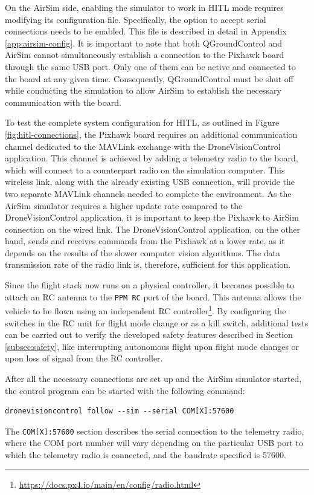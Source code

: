 On the AirSim side, enabling the simulator to work in HITL mode requires modifying its configuration file. Specifically, the option to accept serial connections needs to be enabled. This file is described in detail in Appendix \ref{app:airsim-config}.
It is important to note that both QGroundControl and AirSim cannot simultaneously establish a connection to the Pixhawk board through the same USB port. Only one of them can be active and connected to the board at any given time. Consequently, QGroundControl must be shut off while conducting the simulation to allow AirSim to establish the necessary communication with the board.


To test the complete system configuration for HITL, as outlined in Figure \ref{fig:hitl-connections}, the Pixhawk board requires an additional communication channel dedicated to the MAVLink exchange with the DroneVisionControl application. This channel is achieved by adding a telemetry radio to the board, which will connect to a counterpart radio on the simulation computer. This wireless link, along with the already existing USB connection, will provide the two separate MAVLink channels needed to complete the environment.
As the AirSim simulator requires a higher update rate compared to the DroneVisionControl application, it is important to keep the Pixhawk to AirSim connection on the wired link. The DroneVisionControl application, on the other hand, sends and receives commands from the Pixhawk at a lower rate, as it depends on the results of the slower computer vision algorithms. The data transmission rate of the radio link is, therefore, sufficient for this application.

Since the flight stack now runs on a physical controller, it becomes possible to attach an RC antenna to the \texttt{PPM RC} port of the board. This antenna allows the vehicle to be flown using an independent RC controller\footnote{\url{https://docs.px4.io/main/en/config/radio.html}}. By configuring the switches in the RC unit for flight mode change or as a kill switch, additional tests can be carried out to verify the developed safety features described in Section \ref{subsec:safety}, like interrupting autonomous flight upon flight mode changes or upon loss of signal from the RC controller.


After all the necessary connections are set up and the AirSim simulator started, the control program can be started with the following command:
\begin{verbatim}
dronevisioncontrol follow --sim --serial COM[X]:57600
\end{verbatim}
The \texttt{COM[X]:57600} section describes the serial connection to the telemetry radio, where the COM port number will vary depending on the particular USB port to which the telemetry radio is connected, and the baudrate specified is 57600.



